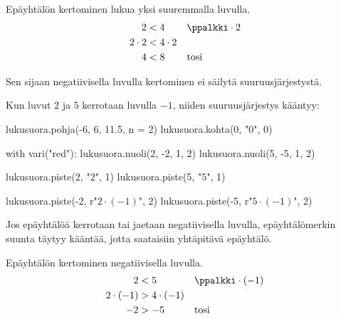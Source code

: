 \begin{esimerkki}
Epäyhtälön kertominen lukua yksi suuremmalla luvulla.
\begin{align*}
     2 &< 4 && \ppalkki \cdot 2 \\
   2\cdot 2 &< 4\cdot 2  \\
     4 &< 8 && \textrm{tosi}
\end{align*}
\end{esimerkki}

Sen sijaan negatiivisella luvulla kertominen ei säilytä suuruusjärjestystä.

\begin{esimerkki}
Kun luvut $2$ ja $5$ kerrotaan luvulla $-1$, niiden suuruusjärjestys kääntyy:

\begin{kuva}
lukusuora.pohja(-6, 6, 11.5, n = 2)
lukusuora.kohta(0, "$0$", 0)

with vari("red"):
	lukusuora.nuoli(2, -2, 1, 2)
	lukusuora.nuoli(5, -5, 1, 2)

lukusuora.piste(2, "$2$", 1)
lukusuora.piste(5, "$5$", 1)

lukusuora.piste(-2, r"$2 \cdot (-1)$", 2)
lukusuora.piste(-5, r"$5 \cdot (-1)$", 2)
\end{kuva}
\end{esimerkki}

Jos epäyhtälöä kerrotaan tai jaetaan negatiivisella luvulla, epäyhtälömerkin suunta täytyy kääntää, jotta saataisiin yhtäpitävä epäyhtälö.

\begin{esimerkki}
Epäyhtälön kertominen negatiivisella luvulla.
\begin{align*}
     2 &< 5 && \ppalkki \cdot (-1) \\
   2\cdot (-1) &> 4\cdot (-1)  \\
     -2 &> -5 && \textrm{tosi}
\end{align*}
\end{esimerkki}


